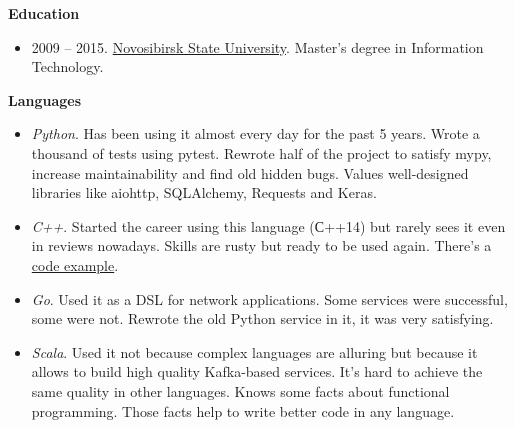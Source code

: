 \documentclass[final]{letter}
\begin{document}
{\bf Education}
\begin{itemize}
  \item 2009 -- 2015. \href{https://www.nsu.ru/n/}{Novosibirsk State University}. Master's degree in Information Technology.
\end{itemize}

{\bf Languages}
\begin{itemize}
\item \textit{Python}. Has been using it almost every day for the past 5 years.
  Wrote a thousand of tests using pytest. Rewrote half of the project to satisfy mypy, increase maintainability and find old hidden bugs.
  Values well-designed libraries like aiohttp, SQLAlchemy, Requests and Keras.
\item \textit{C++}. Started the career using this language (С++14) but rarely sees it even in reviews nowadays. Skills are rusty but ready to be used again.
  There's a \href{https://github.com/neexee/review}{code example}.
\item \textit{Go}. Used it as a DSL for network applications. Some services were successful, some were not.
   Rewrote the old Python service in it, it was very satisfying.
\item \textit{Scala}. Used it not because complex languages are alluring but because it allows to build high quality Kafka-based services. 
  It's hard to achieve the same quality in other languages.
  Knows some facts about functional programming. Those facts help to write better code in any language.
\end{itemize}
\end{document}
